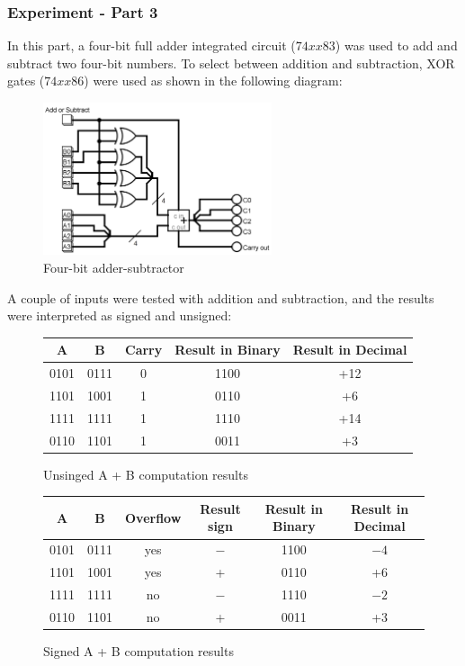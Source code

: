 \documentclass{article}
\begin{document}
\newpage

\subsubsection{Experiment - Part 3}
In this part, a four-bit full adder integrated circuit ($74xx83$) was used to add and subtract two four-bit numbers. To select between addition and subtraction, XOR gates ($74xx86$) were used as shown in the following diagram:
\begin{figure}[H]
	\centering
	\includegraphics[width=0.6\textwidth]{part3.png}
	\caption{Four-bit adder-subtractor}
\end{figure}

A couple of inputs were tested with addition and subtraction, and the results were interpreted as signed and unsigned:

\begin{figure}[H]
\centering
\begin{tabular}{|c|c|c|c|c|}
\hline
A & B & Carry & Result in Binary & Result in Decimal \\
\hline
0101 & 0111 & 0 & 1100 & +12 \\
1101 & 1001 & 1 & 0110 & +6 \\
1111 & 1111 & 1 & 1110 & +14 \\
0110 & 1101 & 1 & 0011 & +3 \\
\hline
\end{tabular}
\caption{Unsinged A + B computation results}
\end{figure}

\begin{figure}[H]
\centering
\begin{tabular}{|c|c|c|c|c|c|}
\hline
A & B & Overflow & Result sign & Result in Binary & Result in Decimal \\
\hline
0101 & 0111 & yes & $-$ & 1100 & $-4$ \\
1101 & 1001 & yes & + & 0110 & +6 \\
1111 & 1111 & no & $-$ & 1110 & $-2$ \\
0110 & 1101 & no & + & 0011 & +3 \\
\hline
\end{tabular}
\caption{Signed A + B computation results}
\end{figure}
\end{document}
